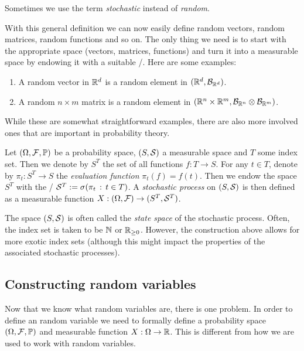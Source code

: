 Sometimes we use the term \emph{stochastic} instead of \emph{random}. 

With this general definition we can now easily define random vectors, random matrices, random functions and so on. The only thing we need is to start with the appropriate space (vectors, matrices, functions) and turn it into a measurable space by endowing it with a suitable \sigalg/. Here are some examples:

\begin{example}\label{example:random_elements}
\hfill
\begin{enumerate}[label=(\alph*)]
\item A random vector in $\mathbb R^d$ is a random element in $(\mathbb R^d, \mathcal B_{\mathbb R^d})$.
\item A random $n \times m$ matrix is a random element in $(\mathbb R^n \times \mathbb R^m, \mathcal B_{\mathbb R^n} \otimes \mathcal B_{\mathbb R^m})$.
\end{enumerate}
\end{example}

While these are somewhat straightforward examples, there are also more involved ones that are important in probability theory.

\begin{example}
Let $(\Omega,\mathcal F,\mathbb P)$ be a probability space, $(S,\mathcal S)$ a measurable space and $T$ some index set. Then we denote by $S^T$ the set of all functions $f : T \to S$. For any $t \in T$, denote by $\pi_t : S^T \to S$ the \emph{evaluation function} $\pi_t(f) = f(t)$. Then we endow the space $S^T$ with the \sigalg/ $\mathcal S^T := \sigma(\pi_t \, : \, t\in T)$. A \emph{stochastic process} on $(S,\mathcal S)$ is then defined as a measurable function $X : (\Omega,\mathcal F) \to (S^T, \mathcal S^T)$.

The space $(S,\mathcal S)$ is often called the \emph{state space} of the stochastic process. Often, the index set is taken to be $\mathbb N$ or $\mathbb R_{\ge 0}$. However, the construction above allows for more exotic index sets (although this might impact the properties of the associated stochastic processes).
\end{example}

\subsection{Constructing random variables}

Now that we know what random variables are, there is one problem. In order to define an random variable we need to formally define a probability space $(\Omega, \mathcal F, \mathbb P)$ and measurable function $X: \Omega \to \mathbb R$. This is different from how we are used to work with random variables. 

